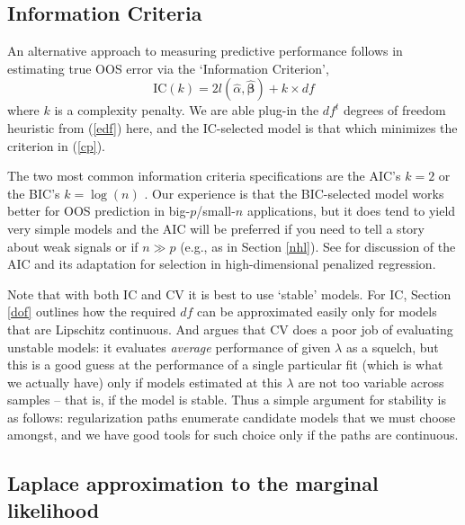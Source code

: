 \documentclass[12pt]{article}
\newcommand{\bs}[1]{\boldsymbol{#1}}
\begin{document}
\subsection{Information Criteria}

An alternative approach to measuring predictive performance follows \citet[see
also \citealt{efron_estimation_2004}]{mallows_comments_1973} in estimating
true OOS error via the `Information Criterion', \begin{equation}\label{cp}
\text{IC}(k) = 2l(\hat\alpha,\bs{\hat\beta}) + k\times df \end{equation} where
$k$ is a complexity penalty.  We are able plug-in the $df^t$ degrees of
freedom heuristic from (\ref{edf}) here, and the IC-selected model is that
which minimizes the criterion in (\ref{cp}).

The two most common information criteria specifications are the AIC's $k=2$
\citep[derived from information theoretic arguments
in][]{akaike_information_1973} or the BIC's $k=\log(n)$ \citep[derived from
approximation to marginal likelihood for a Bayesian model
in][]{schwarz_estimating_1978}.  Our experience is that the BIC-selected model
works better  for OOS prediction in big-$p$/small-$n$ applications, but it does tend to yield very simple models and the
AIC will be preferred if you need to tell a story about weak signals or if $n\gg p$ 
(e.g., as in Section \ref{nhl}).  See \citet{flynn_efficiency_2013} for discussion of the AIC and its adaptation for selection in high-dimensional penalized regression.


Note that with both IC and CV it is best to use `stable'
models. For IC, Section \ref{dof} outlines how the required $df$ can be
approximated easily only for models that are Lipschitz continuous.  And
\citet{breiman_heuristics_1996} argues that CV does a poor job of evaluating
unstable models: it evaluates  {\it average} performance of given $\lambda$
as a squelch, but this is a good guess at the
performance of a single particular fit (which is what we actually have)  only
if models estimated at this $\lambda$ are not too variable across samples --
that is, if the model is stable.  Thus a simple argument for stability is as
follows: regularization paths enumerate candidate models that we must choose
amongst, and we have good tools for such choice only if the paths are
continuous.

\subsection{Laplace approximation to the marginal likelihood}
\end{document}
